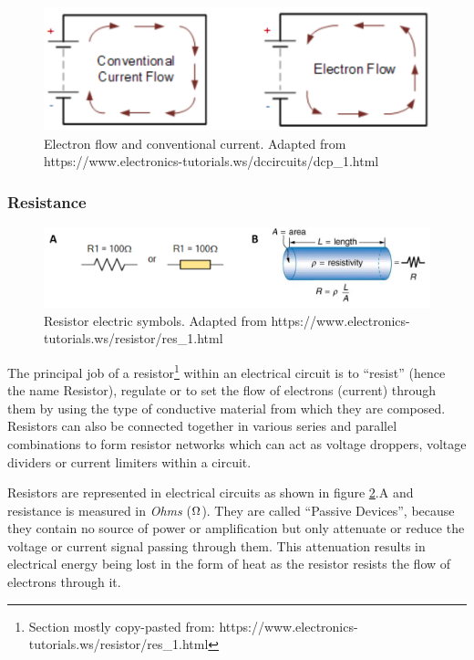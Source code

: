 \begin{figure}[H]
    \centering
    \includegraphics[width=0.65\linewidth]{../../Figures/Electron_Flow.PNG}
    \caption{Electron flow and conventional current. Adapted from https://www.electronics-tutorials.ws/dccircuits/dcp\_1.html}
    \label{fig:Resistors}
\end{figure}

\subsubsection{Resistance}

\begin{figure}[H]
    \centering
    \includegraphics[width=0.65\linewidth]{../../Figures/Resistors.PNG}
    \caption{Resistor electric symbols. Adapted from https://www.electronics-tutorials.ws/resistor/res\_1.html}
    \label{fig:Resistors}
\end{figure}

The principal job of a resistor\footnote{Section mostly copy-pasted from: https://www.electronics-tutorials.ws/resistor/res\_1.html} within an electrical circuit is to “resist” (hence the name Resistor), regulate or to set the flow of electrons (current) through them by using the type of conductive material from which they are composed. Resistors can also be connected together in various series and parallel combinations to form resistor networks which can act as voltage droppers, voltage dividers or current limiters within a circuit.

Resistors are represented in electrical circuits as shown in figure \ref{fig:Resistors}.A and resistance is measured in \textit{Ohms} ($\ohm$). They are called “Passive Devices”, because they contain no source of power or amplification but only attenuate or reduce the voltage or current signal passing through them. This attenuation results in electrical energy being lost in the form of heat as the resistor resists the flow of electrons through it.

